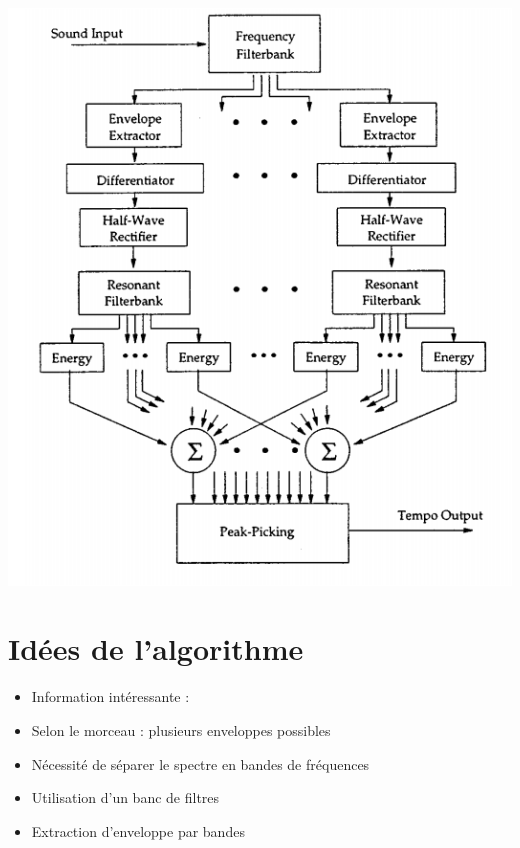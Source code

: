 \documentclass{beamer}
\begin{document}
\begin{frame}
\begin{center}
 \includegraphics[scale = 0.3]{Algo.png}
\end{center}
 \end{frame}
 


 \section{Idées de l'algorithme}
 \begin{frame}
       \tableofcontents[currentsection]
\end{frame}


 \begin{frame}
  \begin{itemize}
  \item Information intéressante : 
  \item<3-> Selon le morceau : plusieurs enveloppes possibles
  \item<4-> Nécessité de séparer le spectre en bandes de fréquences
  \item<5-> Utilisation d'un banc de filtres
  \item<6-> Extraction d'enveloppe par bandes
  \end{itemize}
 \end{frame}
\end{document}
